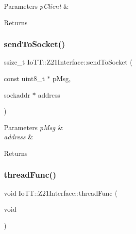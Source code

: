 \begin{DoxyParams}{Parameters}
{\em p\+Client} & \\
\hline
\end{DoxyParams}
\begin{DoxyReturn}{Returns}

\end{DoxyReturn}
\mbox{\label{classIoTT_1_1Z21Interface_a94dfc1d0b95d6217912c04127dba95f2}} 
\subsubsection{\texorpdfstring{send\+To\+Socket()}{sendToSocket()}}
{\footnotesize\ttfamily ssize\+\_\+t Io\+T\+T\+::\+Z21\+Interface\+::send\+To\+Socket (\begin{DoxyParamCaption}\item[{const uint8\+\_\+t $\ast$}]{p\+Msg,  }\item[{sockaddr $\ast$}]{address }\end{DoxyParamCaption})}


\begin{DoxyParams}{Parameters}
{\em p\+Msg} & \\
\hline
{\em address} & \\
\hline
\end{DoxyParams}
\begin{DoxyReturn}{Returns}

\end{DoxyReturn}
\mbox{\label{classIoTT_1_1Z21Interface_a6dd3e3e6c925e4cc09efa1b219936428}} 
\subsubsection{\texorpdfstring{thread\+Func()}{threadFunc()}}
{\footnotesize\ttfamily void Io\+T\+T\+::\+Z21\+Interface\+::thread\+Func (\begin{DoxyParamCaption}\item[{void}]{ }\end{DoxyParamCaption})\hspace{0.3cm}{\ttfamily [private]}}



